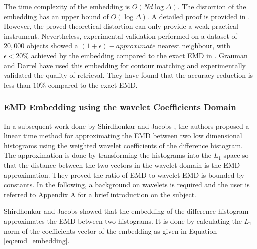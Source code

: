 \iftoggle{edit-mode}{\hspace{0pt}\marginpar{Performance}}{} 
The time complexity of the embedding is $O(Nd \log{\Delta})$. 
The distortion of the embedding has an upper bound of $O(\log \Delta)$. 
A detailed proof is provided in \cite{indyk2003fast}. 
However, the proved theoretical distortion can only provide a weak practical instrument. 
Nevertheless, experimental validation performed on a dataset of $20,000$ objects showed a $(1+\epsilon)-approximate$ nearest neighbour, with $\epsilon < 20\%$ achieved by the embedding compared to the exact EMD in \cite{indyk2003fast}. 
Grauman and Darrel \cite{grauman2004fast} have used this embedding for contour matching and experimentally validated the quality of retrieval. 
They have found that the accuracy reduction is less than $10\%$ compared to the exact EMD.

\subsubsection{EMD Embedding using the wavelet Coefficients Domain}

\iftoggle{edit-mode}{\hspace{0pt}\marginpar{Wavelet embedding}}{}
In a subsequent work done by Shirdhonkar and Jacobs \cite{shirdhonkar2008approximate}, the authors proposed a linear time method for approximating the EMD between two low dimensional histograms using the weighted wavelet coefficients of the difference histogram. 
The approximation is done by transforming the histograms into the $L_1$ space so that the distance between the two vectors in the wavelet domain is the EMD approximation. 
They proved the ratio of EMD to wavelet EMD is bounded by constants. 
In the following, a background on wavelets is required and the user is referred to Appendix A for a brief introduction on the subject.

\iftoggle{edit-mode}{\hspace{0pt}\marginpar{EMD embedding to the wavelet domain}}{}
Shirdhonkar and Jacobs showed that the embedding of the difference histogram approximates the EMD between two histograms. 
It is done by calculating the $L_1$ norm of the coefficients vector of the embedding as given in Equation \ref{eq:emd_embedding}.

